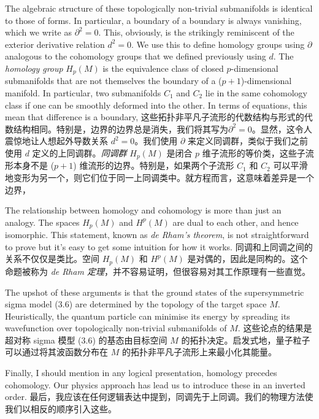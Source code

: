 \documentclass{article}
\begin{document}
\begin{paracol}{2}
The algebraic structure of these topologically non-trivial submanifolds is identical to those of forms. In particular, a boundary of a boundary is always vanishing, which we write as $\partial^2 = 0$. This, obviously, is the strikingly reminiscent of the exterior derivative relation $d^2 = 0$. We use this to deﬁne homology groups using $\partial$ analogous to the cohomology groups that we deﬁned previously using $d$. The \textit{homology group} $H_p(M)$ is the equivalence class of closed $p$-dimensional submanifolds that are not themselves the boundary of a ($p+1$)-dimensional manifold. In particular, two submanifolds $C_1$ and $C_2$ lie in the same cohomology class if one can be smoothly deformed into the other. In terms of equations, this mean that diﬀerence is a boundary,
\switchcolumn
这些拓扑非平凡子流形的代数结构与形式的代数结构相同。特别是，边界的边界总是消失，我们将其写为$\partial^2 = 0$。显然，这令人震惊地让人想起外导数关系 $d^2 = 0$。我们使用 $\partial$ 来定义同调群，类似于我们之前使用 $d$ 定义的上同调群。\textit{同调群} $H_p(M)$ 是闭合 $p$ 维子流形的等价类，这些子流形本身不是 ($p+1$) 维流形的边界。特别是，如果两个子流形 $C_1$ 和 $C_2$ 可以平滑地变形为另一个，则它们位于同一上同调类中。就方程而言，这意味着差异是一个边界，
\switchcolumn*

The relationship between homology and cohomology is more than just an analogy. The spaces $H_p(M)$ and $H^p(M)$ are dual to each other, and hence isomorphic. This statement, known as \textit{de Rham’s theorem}, is not straightforward to prove but it’s easy to get some intuition for how it works.
\switchcolumn
同调和上同调之间的关系不仅仅是类比。空间 $H_p(M)$ 和 $H^p(M)$ 是对偶的，因此是同构的。这个命题被称为 \textit{de Rham 定理}，并不容易证明，但很容易对其工作原理有一些直觉。
\switchcolumn*

The upshot of these arguments is that the ground states of the supersymmetric sigma model (3.6) are determined by the topology of the target space $M$. Heuristically, the quantum particle can minimise its energy by spreading its wavefunction over topologically non-trivial submanifolds of $M$.
\switchcolumn
这些论点的结果是超对称 sigma 模型 (3.6) 的基态由目标空间 $M$ 的拓扑决定。启发式地，量子粒子可以通过将其波函数分布在 $M$ 的拓扑非平凡子流形上来最小化其能量。
\switchcolumn*

Finally, I should mention in any logical presentation, homology precedes cohomology. Our physics approach has lead us to introduce these in an inverted order.
\switchcolumn
最后，我应该在任何逻辑表达中提到，同调先于上同调。我们的物理方法使我们以相反的顺序引入这些。
\switchcolumn*


\end{paracol}
\end{document}
